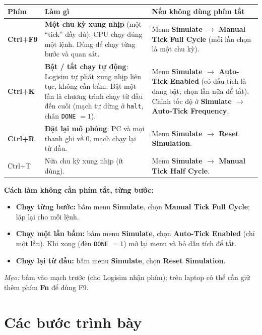\documentclass[11pt,a4paper]{article}
\newcommand{\menu}[1]{\textbf{Simulate $\rightarrow$ #1}}
\begin{document}
\begin{center}
\small
\begin{tabular}{@{}>{\raggedright\arraybackslash}p{2.2cm}>{\raggedright\arraybackslash}p{7.2cm}>{\raggedright\arraybackslash}p{6.2cm}@{}}
\toprule
\textbf{Phím} & \textbf{Làm gì} & \textbf{Nếu không dùng phím tắt}\\
\midrule
\textbf{Ctrl+F9} & \textbf{Một chu kỳ xung nhịp} (một ``tick'' đầy đủ): CPU chạy đúng một lệnh. Dùng để chạy từng bước và quan sát. & Menu \menu{Manual Tick Full Cycle} (mỗi lần chọn là một chu kỳ).\\
\addlinespace
\textbf{Ctrl+K} & \textbf{Bật / tắt chạy tự động}: Logisim tự phát xung nhịp liên tục, không cần bấm. Bật một lần là chương trình chạy từ đầu đến cuối (mạch tự dừng ở \texttt{halt}, chân \texttt{DONE} $=1$). & Menu \menu{Auto-Tick Enabled} (có dấu tích là đang bật; chọn lần nữa để tắt). Chỉnh tốc độ ở \menu{Auto-Tick Frequency}.\\
\addlinespace
\textbf{Ctrl+R} & \textbf{Đặt lại mô phỏng}: PC và mọi thanh ghi về 0, mạch chạy lại từ đầu. & Menu \menu{Reset Simulation}.\\
\addlinespace
Ctrl+T & Nửa chu kỳ xung nhịp (ít dùng). & Menu \menu{Manual Tick Half Cycle}.\\
\bottomrule
\end{tabular}
\end{center}

\textbf{Cách làm không cần phím tắt, từng bước:}
\begin{itemize}
  \item \textbf{Chạy từng bước:} bấm menu \textbf{Simulate}, chọn \textbf{Manual Tick Full Cycle}; lặp lại cho mỗi lệnh.
  \item \textbf{Chạy một lần bấm:} bấm menu \textbf{Simulate}, chọn \textbf{Auto-Tick Enabled} (chỉ một lần). Khi xong (đèn \texttt{DONE} $=1$) mở lại menu và bỏ dấu tích để tắt.
  \item \textbf{Chạy lại từ đầu:} bấm menu \textbf{Simulate}, chọn \textbf{Reset Simulation}.
\end{itemize}
\emph{Mẹo:} bấm vào mạch trước (cho Logisim nhận phím); trên laptop có thể cần giữ thêm phím \textbf{Fn} để dùng F9.

\section{Các bước trình bày}
\end{document}
